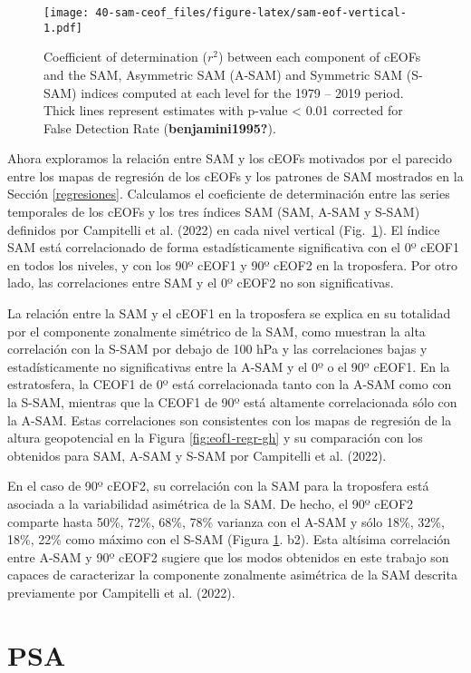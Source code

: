 \documentclass[12pt,oneside]{reedthesis}
\begin{document}
\begin{figure}
\centering
\texttt{[image: 40-sam-ceof\_files/figure-latex/sam-eof-vertical-1.pdf]}
\caption{\label{fig:sam-eof-vertical}Coefficient of determination (\(r^2\)) between each component of cEOFs and the SAM, Asymmetric SAM (A-SAM) and Symmetric SAM (S-SAM) indices computed at each level for the 1979 -- 2019 period. Thick lines represent estimates with p-value \textless{} 0.01 corrected for False Detection Rate (\textbf{benjamini1995?}).}
\end{figure}
Ahora exploramos la relación entre SAM y los cEOFs motivados por el parecido entre los mapas de regresión de los cEOFs y los patrones de SAM mostrados en la Sección \ref{regresiones}.
Calculamos el coeficiente de determinación entre las series temporales de los cEOFs y los tres índices SAM (SAM, A-SAM y S-SAM) definidos por Campitelli et al. (2022) en cada nivel vertical (Fig.~\ref{fig:sam-eof-vertical}).
El índice SAM está correlacionado de forma estadísticamente significativa con el 0º cEOF1 en todos los niveles, y con los 90º cEOF1 y 90º cEOF2 en la troposfera.
Por otro lado, las correlaciones entre SAM y el 0º cEOF2 no son significativas.

La relación entre la SAM y el cEOF1 en la troposfera se explica en su totalidad por el componente zonalmente simétrico de la SAM, como muestran la alta correlación con la S-SAM por debajo de 100 hPa y las correlaciones bajas y estadísticamente no significativas entre la A-SAM y el 0º o el 90º cEOF1.
En la estratosfera, la CEOF1 de 0º está correlacionada tanto con la A-SAM como con la S-SAM, mientras que la CEOF1 de 90º está altamente correlacionada sólo con la A-SAM.
Estas correlaciones son consistentes con los mapas de regresión de la altura geopotencial en la Figura \ref{fig:eof1-regr-gh} y su comparación con los obtenidos para SAM, A-SAM y S-SAM por Campitelli et al. (2022).

En el caso de 90º cEOF2, su correlación con la SAM para la troposfera está asociada a la variabilidad asimétrica de la SAM.
De hecho, el 90º cEOF2 comparte hasta 50\%, 72\%, 68\%, 78\% varianza con el A-SAM y sólo 18\%, 32\%, 18\%, 22\% como máximo con el S-SAM (Figura \ref{fig:sam-eof-vertical}.
b2).
Esta altísima correlación entre A-SAM y 90º cEOF2 sugiere que los modos obtenidos en este trabajo son capaces de caracterizar la componente zonalmente asimétrica de la SAM descrita previamente por Campitelli et al. (2022).

\hypertarget{psa}{%
\section{PSA}\label{psa}}
\end{document}
